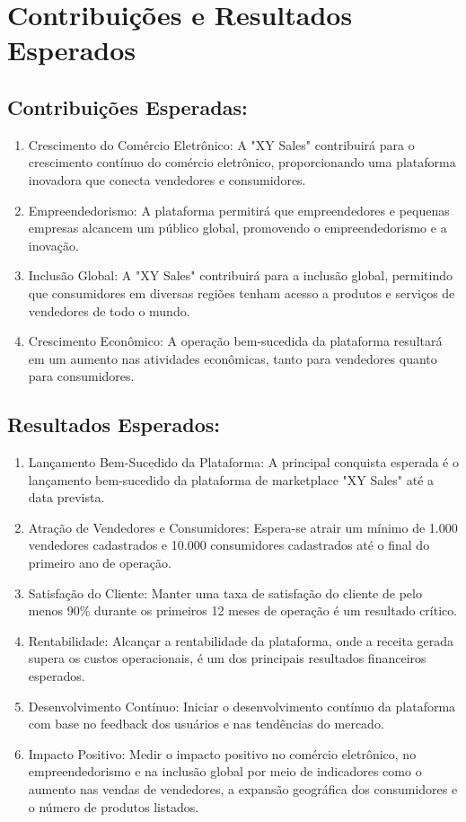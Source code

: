 \documentclass[
	12pt,				%
	openright,			%
	twoside,			%
	a4paper,			%
	english,			%
	brazil				%
	]{abntex2}
\begin{document}
\chapter{Contribuições e Resultados Esperados}\label{cap_contribuicoes_e_resultados_esperados}

\section{Contribuições Esperadas:}
\begin{enumerate}
    \item Crescimento do Comércio Eletrônico: A "XY Sales" contribuirá para o crescimento contínuo do comércio eletrônico, proporcionando uma plataforma inovadora que conecta vendedores e consumidores.
    \item Empreendedorismo: A plataforma permitirá que empreendedores e pequenas empresas alcancem um público global, promovendo o empreendedorismo e a inovação.
    \item Inclusão Global: A "XY Sales" contribuirá para a inclusão global, permitindo que consumidores em diversas regiões tenham acesso a produtos e serviços de vendedores de todo o mundo.
    \item Crescimento Econômico: A operação bem-sucedida da plataforma resultará em um aumento nas atividades econômicas, tanto para vendedores quanto para consumidores.
\end{enumerate}

\section{Resultados Esperados:}
\begin{enumerate}
    \item Lançamento Bem-Sucedido da Plataforma: A principal conquista esperada é o lançamento bem-sucedido da plataforma de marketplace "XY Sales" até a data prevista.
    \item Atração de Vendedores e Consumidores: Espera-se atrair um mínimo de 1.000 vendedores cadastrados e 10.000 consumidores cadastrados até o final do primeiro ano de operação.
    \item Satisfação do Cliente: Manter uma taxa de satisfação do cliente de pelo menos 90\% durante os primeiros 12 meses de operação é um resultado crítico.
    \item Rentabilidade: Alcançar a rentabilidade da plataforma, onde a receita gerada supera os custos operacionais, é um dos principais resultados financeiros esperados.
    \item Desenvolvimento Contínuo: Iniciar o desenvolvimento contínuo da plataforma com base no feedback dos usuários e nas tendências do mercado.
    \item Impacto Positivo: Medir o impacto positivo no comércio eletrônico, no empreendedorismo e na inclusão global por meio de indicadores como o aumento nas vendas de vendedores, a expansão geográfica dos consumidores e o número de produtos listados.
\end{enumerate}
\end{document}
